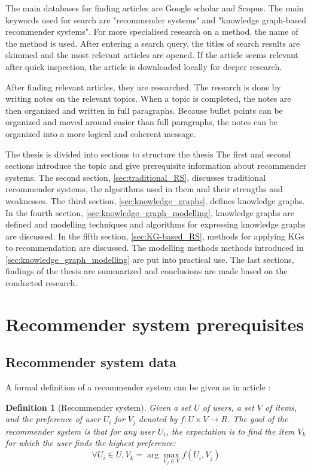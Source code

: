 \documentclass[english, 12pt, a4paper, sci, utf8, a-2b, online]{aaltothesis}
\newtheorem{definition}{Definition}[section]
\begin{document}
The main databases for finding articles are Google scholar and Scopus. The main keywords used for search are "recommender systems" and "knowledge graph-based recommender systems". For more specialised research on a method, the name of the method is used. After entering a search query, the titles of search results are skimmed and the most relevant articles are opened. If the article seems relevant after quick inspection, the article is downloaded locally for deeper research.

After finding relevant articles, they are researched. The research is done by writing notes on the relevant topics. When a topic is completed, the notes are then organized and written in full paragraphs. Because bullet points can be organized and moved around easier than full paragraphs, the notes can be organized into a more logical and coherent message.

The thesis is divided into sections to structure the thesis The first and second sections introduce the topic and give prerequisite information about recommender systems. The second section, \autoref{sec:traditional_RS}, discusses traditional recommender systems, the algorithms used in them and their strengths and weaknesses. The third section, \autoref{sec:knowledge_graphs}, defines knowledge graphs. In the fourth section, \autoref{sec:knowledge_graph_modelling}, knowledge graphs are defined and modelling techniques and algorithms for expressing knowledge graphs are discussed. In the fifth section, \autoref{sec:KG-based_RS}, methods for applying KGs to recommendation are discussed. The modelling methods methods introduced in \autoref{sec:knowledge_graph_modelling} are put into practical use. The last sections, findings of the thesis are summarized and conclusions are made based on the conducted research.

\newpage

\section{Recommender system prerequisites}

\subsection{Recommender system data}

A formal definition of a recommender system can be given as in article \parencite{ZHANG2024123876}: 

\begin{definition}[Recommender system]
\label{def:recommender_system}
    Given a set $U$ of users, a set $V$ of items, and the preference of user $U_i$ for $V_j$ denoted by $f:U\times V \rightarrow R$. The goal of the recommender system is that for any user $U_i$, the expectation is to find the item $V_k$ for which the user finds the highest preference:
    \begin{equation*}\label{eq:recommender_system}
        \forall U_i \in U,V_k = \arg\max_{V_j\in V}f(U_i, V_j)
    \end{equation*}
\end{definition}
\end{document}
